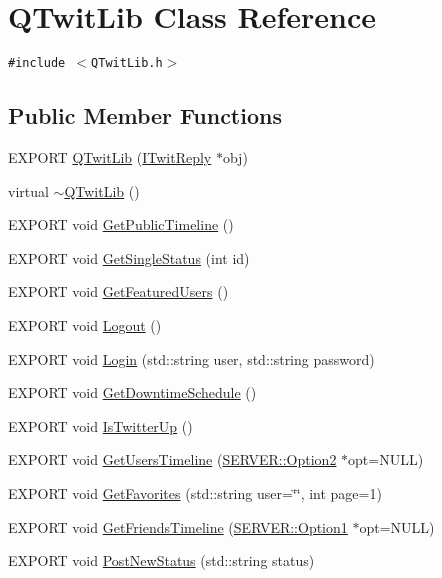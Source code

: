 \hypertarget{classQTwitLib}{
\section{QTwitLib Class Reference}
\label{classQTwitLib}
}
{\tt \#include $<$QTwitLib.h$>$}

\subsection*{Public Member Functions}
\begin{CompactItemize}
\item 
EXPORT \hyperlink{classQTwitLib_05a415b71f2ad7b6b5af3df5c070e9e2}{QTwitLib} (\hyperlink{classITwitReply}{ITwitReply} $\ast$obj)
\item 
virtual \hyperlink{classQTwitLib_8a2629b2c3afe96eccf411224019aabb}{$\sim$QTwitLib} ()
\item 
EXPORT void \hyperlink{classQTwitLib_af025ecfc615510eacb42b7522c266a9}{GetPublicTimeline} ()
\item 
EXPORT void \hyperlink{classQTwitLib_892fc8f5a0c0198e6d80b12bfb28e4b1}{GetSingleStatus} (int id)
\item 
EXPORT void \hyperlink{classQTwitLib_cb2283600d80a9b733dda9307b8400e4}{GetFeaturedUsers} ()
\item 
EXPORT void \hyperlink{classQTwitLib_c2967d2e8ded282821034f4bc0caa2aa}{Logout} ()
\item 
EXPORT void \hyperlink{classQTwitLib_7d42e8478d2eb87b147cd3df0f8771e8}{Login} (std::string user, std::string password)
\item 
EXPORT void \hyperlink{classQTwitLib_0a8aa39556fc28d406ac4441e551dd50}{GetDowntimeSchedule} ()
\item 
EXPORT void \hyperlink{classQTwitLib_b2e5ba83065079134755ac6815a58788}{IsTwitterUp} ()
\item 
EXPORT void \hyperlink{classQTwitLib_999f01850a12a88d243332dc2bf755f4}{GetUsersTimeline} (\hyperlink{structSERVER_1_1Option2}{SERVER::Option2} $\ast$opt=NULL)
\item 
EXPORT void \hyperlink{classQTwitLib_7b3774941753d8746a55ae0df19b7959}{GetFavorites} (std::string user=\char`\"{}\char`\"{}, int page=1)
\item 
EXPORT void \hyperlink{classQTwitLib_a6d4b6755131819aa80b23050b0f2e90}{GetFriendsTimeline} (\hyperlink{structSERVER_1_1Option1}{SERVER::Option1} $\ast$opt=NULL)
\item 
EXPORT void \hyperlink{classQTwitLib_c22d0aa3bde76fba0ce2d45179d1494b}{PostNewStatus} (std::string status)

\end{CompactItemize}
